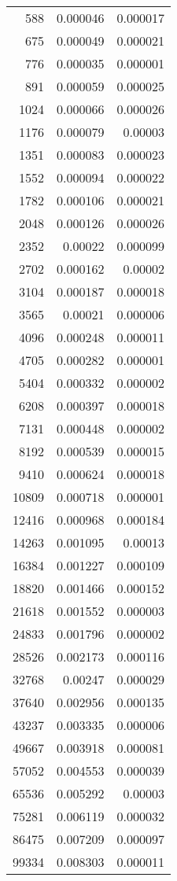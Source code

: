 \begin{longtable}{r r r}
588 & 0.000046 & 0.000017 \\
675 & 0.000049 & 0.000021 \\
776 & 0.000035 & 0.000001 \\
891 & 0.000059 & 0.000025 \\
1024 & 0.000066 & 0.000026 \\
1176 & 0.000079 & 0.00003 \\
1351 & 0.000083 & 0.000023 \\
1552 & 0.000094 & 0.000022 \\
1782 & 0.000106 & 0.000021 \\
2048 & 0.000126 & 0.000026 \\
2352 & 0.00022 & 0.000099 \\
2702 & 0.000162 & 0.00002 \\
3104 & 0.000187 & 0.000018 \\
3565 & 0.00021 & 0.000006 \\
4096 & 0.000248 & 0.000011 \\
4705 & 0.000282 & 0.000001 \\
5404 & 0.000332 & 0.000002 \\
6208 & 0.000397 & 0.000018 \\
7131 & 0.000448 & 0.000002 \\
8192 & 0.000539 & 0.000015 \\
9410 & 0.000624 & 0.000018 \\
10809 & 0.000718 & 0.000001 \\
12416 & 0.000968 & 0.000184 \\
14263 & 0.001095 & 0.00013 \\
16384 & 0.001227 & 0.000109 \\
18820 & 0.001466 & 0.000152 \\
21618 & 0.001552 & 0.000003 \\
24833 & 0.001796 & 0.000002 \\
28526 & 0.002173 & 0.000116 \\
32768 & 0.00247 & 0.000029 \\
37640 & 0.002956 & 0.000135 \\
43237 & 0.003335 & 0.000006 \\
49667 & 0.003918 & 0.000081 \\
57052 & 0.004553 & 0.000039 \\
65536 & 0.005292 & 0.00003 \\
75281 & 0.006119 & 0.000032 \\
86475 & 0.007209 & 0.000097 \\
99334 & 0.008303 & 0.000011 \\

\end{longtable}
